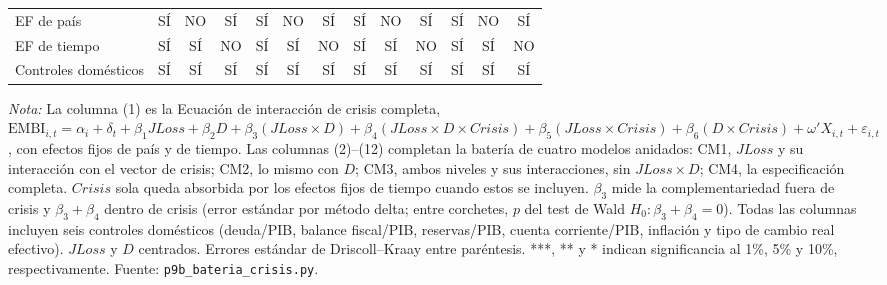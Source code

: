 \documentclass[11pt]{article}
\begin{document}
\begin{landscape}
\begin{table}
\begin{tabular}{l c ccc ccc ccc cc}
\midrule
EF de país & SÍ & NO & SÍ & SÍ & NO & SÍ & SÍ & NO & SÍ & SÍ & NO & SÍ \\
EF de tiempo & SÍ & SÍ & NO & SÍ & SÍ & NO & SÍ & SÍ & NO & SÍ & SÍ & NO \\
Controles domésticos & SÍ & SÍ & SÍ & SÍ & SÍ & SÍ & SÍ & SÍ & SÍ & SÍ & SÍ & SÍ \\
\bottomrule
\end{tabular}
\par\smallskip\parbox{\linewidth}{\scriptsize \textit{Nota:} La columna (1) es la Ecuación de interacción de crisis completa, $\mathrm{EMBI}_{i,t}=\alpha_i+\delta_t+\beta_1 JLoss+\beta_2 D+\beta_3(JLoss\times D)+\beta_4(JLoss\times D\times Crisis)+\beta_5(JLoss\times Crisis)+\beta_6(D\times Crisis)+\omega'X_{i,t}+\varepsilon_{i,t}$, con efectos fijos de país y de tiempo. Las columnas (2)--(12) completan la batería de cuatro modelos anidados: CM1, $JLoss$ y su interacción con el vector de crisis; CM2, lo mismo con $D$; CM3, ambos niveles y sus interacciones, sin $JLoss\times D$; CM4, la especificación completa. $Crisis$ sola queda absorbida por los efectos fijos de tiempo cuando estos se incluyen. $\beta_3$ mide la complementariedad fuera de crisis y $\beta_3+\beta_4$ dentro de crisis (error estándar por método delta; entre corchetes, $p$ del test de Wald $H_0\!:\beta_3+\beta_4=0$). Todas las columnas incluyen seis controles domésticos (deuda/PIB, balance fiscal/PIB, reservas/PIB, cuenta corriente/PIB, inflación y tipo de cambio real efectivo). $JLoss$ y $D$ centrados. Errores estándar de Driscoll--Kraay entre paréntesis. ***, ** y * indican significancia al 1\%, 5\% y 10\%, respectivamente. Fuente: \texttt{p9b\_bateria\_crisis.py}.}
\end{table}
\end{landscape}
\end{document}
